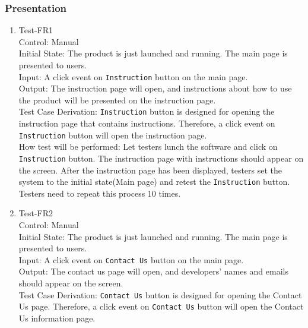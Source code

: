 \documentclass[12pt, titlepage]{article}
\begin{document}
\subsubsection{Presentation}
\begin{enumerate}
\item{Test-FR1\\}
Control: Manual\\ 

Initial State: The product is just launched and running. The main 
page is presented to users.\\

Input: A click event on \verb|Instruction| button on the main page.\\

Output: The instruction page will open, and instructions about how 
to use the product will be presented on the instruction page.\\

Test Case Derivation: \verb|Instruction| button is designed for 
opening the instruction page that contains instructions. Therefore, 
a click event on \verb|Instruction| button will open the instruction
page.\\
					
How test will be performed: Let testers lunch the software and click
on  \verb|Instruction| button. The instruction page with 
instructions should appear on the  screen. After the instruction 
page has been displayed, testers set the system to the 
initial state(Main page) and retest the \verb|Instruction| button. 
Testers need to repeat this process 10 times.

\item{Test-FR2\\}
Control: Manual\\ 

Initial State: The product is just launched and running. The main 
page is presented to users.\\

Input: A click event on \verb|Contact Us| button on the main page.\\

Output: The contact us page will open, and developers' names and
emails should appear on the screen.\\

Test Case Derivation: \verb|Contact Us| button is designed for 
opening the Contact Us page. Therefore, 
a click event on \verb|Contact Us| button will open the Contact 
Us information page.\\
					

\end{enumerate}
\end{document}
